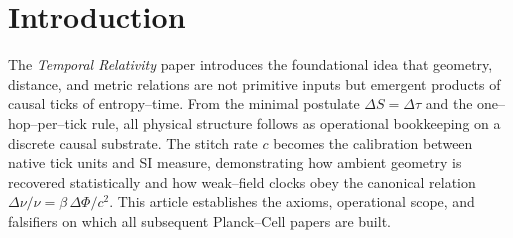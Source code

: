 \section*{Introduction}

The \emph{Temporal Relativity} paper introduces the foundational idea that
geometry, distance, and metric relations are not primitive inputs but emergent
products of causal ticks of entropy--time.  From the minimal postulate
$\Delta S = \Delta\tau$ and the one--hop--per--tick rule, all physical structure
follows as operational bookkeeping on a discrete causal substrate.  The stitch
rate $c$ becomes the calibration between native tick units and SI measure,
demonstrating how ambient geometry is recovered statistically and how weak--field
clocks obey the canonical relation $\Delta\nu/\nu = \beta\,\Delta\Phi/c^2$.
This article establishes the axioms, operational scope, and falsifiers on which
all subsequent Planck--Cell papers are built.
